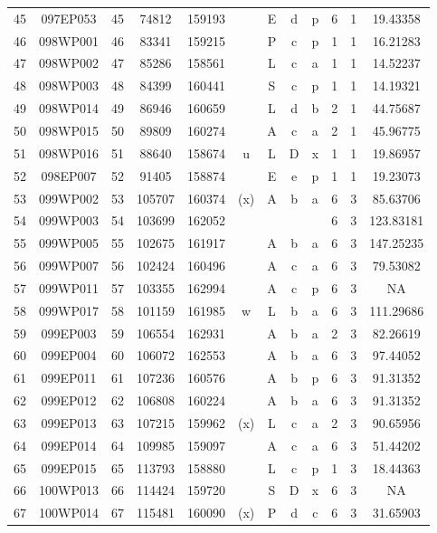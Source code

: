 \begin{tabular}{|*{12}{c|}}
45 & 097EP053 & 45 & 74812 & 159193 &  & E & d & p & 6 & 1 & 19.43358 \\ 
46 & 098WP001 & 46 & 83341 & 159215 &  & P & c & p & 1 & 1 & 16.21283 \\ 
47 & 098WP002 & 47 & 85286 & 158561 &  & L & c & a & 1 & 1 & 14.52237 \\ 
48 & 098WP003 & 48 & 84399 & 160441 &  & S & c & p & 1 & 1 & 14.19321 \\ 
49 & 098WP014 & 49 & 86946 & 160659 &  & L & d & b & 2 & 1 & 44.75687 \\ 
50 & 098WP015 & 50 & 89809 & 160274 &  & A & c & a & 2 & 1 & 45.96775 \\ 
51 & 098WP016 & 51 & 88640 & 158674 & u & L & D & x & 1 & 1 & 19.86957 \\ 
52 & 098EP007 & 52 & 91405 & 158874 &  & E & e & p & 1 & 1 & 19.23073 \\ 
53 & 099WP002 & 53 & 105707 & 160374 & (x) & A & b & a & 6 & 3 & 85.63706 \\ 
54 & 099WP003 & 54 & 103699 & 162052 &  &  &  &  & 6 & 3 & 123.83181 \\ 
55 & 099WP005 & 55 & 102675 & 161917 &  & A & b & a & 6 & 3 & 147.25235 \\ 
56 & 099WP007 & 56 & 102424 & 160496 &  & A & c & a & 6 & 3 & 79.53082 \\ 
57 & 099WP011 & 57 & 103355 & 162994 &  & A & c & p & 6 & 3 & NA \\ 
58 & 099WP017 & 58 & 101159 & 161985 & w & L & b & a & 6 & 3 & 111.29686 \\ 
59 & 099EP003 & 59 & 106554 & 162931 &  & A & b & a & 2 & 3 & 82.26619 \\ 
60 & 099EP004 & 60 & 106072 & 162553 &  & A & b & a & 6 & 3 & 97.44052 \\ 
61 & 099EP011 & 61 & 107236 & 160576 &  & A & b & p & 6 & 3 & 91.31352 \\ 
62 & 099EP012 & 62 & 106808 & 160224 &  & A & b & a & 6 & 3 & 91.31352 \\ 
63 & 099EP013 & 63 & 107215 & 159962 & (x) & L & c & a & 2 & 3 & 90.65956 \\ 
64 & 099EP014 & 64 & 109985 & 159097 &  & A & c & a & 6 & 3 & 51.44202 \\ 
65 & 099EP015 & 65 & 113793 & 158880 &  & L & c & p & 1 & 3 & 18.44363 \\ 
66 & 100WP013 & 66 & 114424 & 159720 &  & S & D & x & 6 & 3 & NA \\ 
67 & 100WP014 & 67 & 115481 & 160090 & (x) & P & d & c & 6 & 3 & 31.65903 \\ 

\end{tabular}
